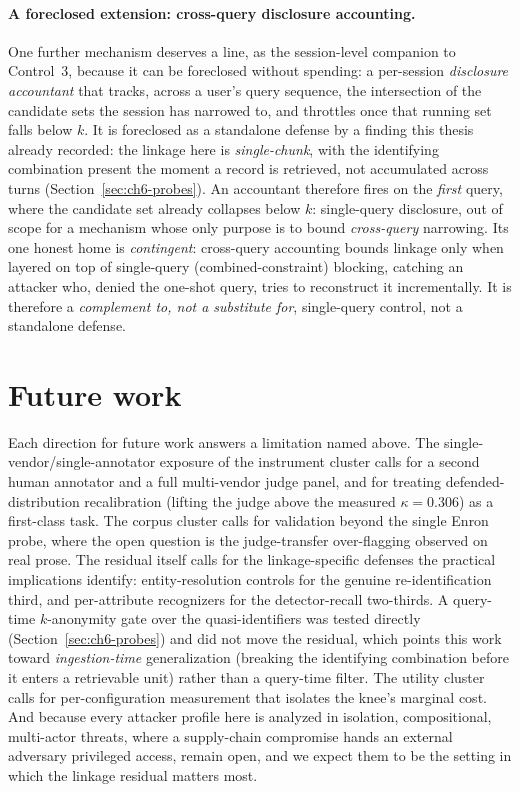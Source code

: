 \paragraph{A foreclosed extension: cross-query disclosure accounting.} One further mechanism deserves a
line, as the session-level companion to Control~3, because it can be foreclosed without spending: a
per-session \emph{disclosure accountant} that tracks, across a user's query sequence, the intersection of
the candidate sets the session has narrowed to, and throttles once that running set falls below $k$. It is
foreclosed as a standalone defense by a finding this thesis already recorded: the linkage here is
\emph{single-chunk}, with the identifying combination present the moment a record is retrieved, not
accumulated across turns (Section~\ref{sec:ch6-probes}). An accountant therefore fires on the \emph{first}
query, where the candidate set already collapses below $k$: single-query disclosure, out of scope for a
mechanism whose only purpose is to bound \emph{cross-query} narrowing. Its one honest home is
\emph{contingent}: cross-query accounting bounds linkage only when layered on top of single-query
(combined-constraint) blocking, catching an attacker who, denied the one-shot query, tries to reconstruct
it incrementally. It is therefore a \emph{complement to, not a substitute for}, single-query control, not a
standalone defense.

\section{Future work}
\label{sec:disc-future}

Each direction for future work answers a limitation named above. The single-vendor/single-annotator
exposure of the instrument cluster calls for a second human annotator and a full multi-vendor
judge panel, and for treating defended-distribution recalibration (lifting the judge above the
measured $\kappa = 0.306$) as a first-class task. The corpus cluster calls for validation
beyond the single Enron probe, where the open question is the judge-transfer over-flagging
observed on real prose. The residual itself calls for the linkage-specific defenses the practical
implications identify: entity-resolution controls for the genuine re-identification third, and
per-attribute recognizers for the detector-recall two-thirds. A query-time $k$-anonymity gate over
the quasi-identifiers was tested directly (Section~\ref{sec:ch6-probes}) and did not move the
residual, which points this work toward \emph{ingestion-time} generalization (breaking the
identifying combination before it enters a retrievable unit) rather than a query-time filter. The utility cluster calls for
per-configuration measurement that isolates the knee's marginal cost. And because every attacker
profile here is analyzed in isolation, compositional, multi-actor threats, where a
supply-chain compromise hands an external adversary privileged access, remain open, and we
expect them to be the setting in which the linkage residual matters most.


